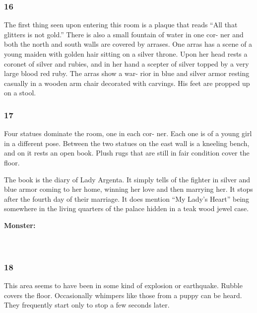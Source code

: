 \documentclass[palace_of_the_silver_princess]{subfiles}
\begin{document}
\subsubsection{16}
\begin{quotebox}
    The first thing seen upon entering this room is a plaque that reads
    “All that glitters is not gold.” There is also a small fountain of
    water in one cor- ner and both the north and south walls are covered
    by arrases. One arras has a scene of a young maiden with golden hair
    sitting on a silver throne. Upon her head rests a coronet of silver
    and rubies, and in her hand a scepter of silver topped by a very
    large blood red ruby. The arras show a war- rior in blue and silver
    armor resting casually in a wooden arm chair decorated with
    carvings. His feet are propped up on a stool.
\end{quotebox}

\subsubsection{17}
\begin{quotebox}
    Four statues dominate the room, one in each cor- ner. Each one is of
    a young girl in a different pose. Between the two statues on the
    east wall is a kneeling bench, and on it rests an open book. Plush
    rugs that are still in fair condition cover the floor.
\end{quotebox}

The book is the diary of Lady Argenta. It simply tells of the fighter in
silver and blue armor coming to her home, winning her love and then
marrying her. It stops after the fourth day of their marriage. It does
mention “My Lady’s Heart” being somewhere in the living quarters of the
palace hidden in a teak wood jewel case.

\textbf{Monster:}
\\
\\
\\

\subsubsection{18}
\begin{quotebox}
    This area seems to have been in some kind of explosion or
    earthquake. Rubble covers the floor. Occasionally whimpers like
    those from a puppy can be heard. They frequently start only to stop
    a few seconds later.
\end{quotebox}
\end{document}

